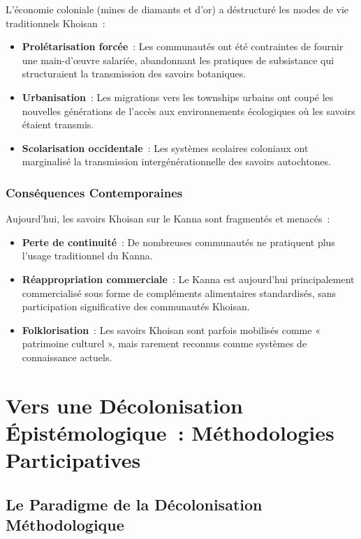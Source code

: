 \documentclass[12pt,a4paper,twoside]{book}
\begin{document}
L'économie coloniale (mines de diamants et d'or) a déstructuré les modes de vie traditionnels Khoisan~:

\begin{itemize}
\item \textbf{Prolétarisation forcée}~: Les communautés ont été contraintes de fournir une main-d'œuvre salariée, abandonnant les pratiques de subsistance qui structuraient la transmission des savoirs botaniques.

\item \textbf{Urbanisation}~: Les migrations vers les townships urbains ont coupé les nouvelles générations de l'accès aux environnements écologiques où les savoirs étaient transmis.

\item \textbf{Scolarisation occidentale}~: Les systèmes scolaires coloniaux ont marginalisé la transmission intergénérationnelle des savoirs autochtones.
\end{itemize}

\subsubsection{Conséquences Contemporaines}

Aujourd'hui, les savoirs Khoisan sur le Kanna sont fragmentés et menacés~:

\begin{itemize}
\item \textbf{Perte de continuité}~: De nombreuses communautés ne pratiquent plus l'usage traditionnel du Kanna.

\item \textbf{Réappropriation commerciale}~: Le Kanna est aujourd'hui principalement commercialisé sous forme de compléments alimentaires standardisés, sans participation significative des communautés Khoisan.

\item \textbf{Folklorisation}~: Les savoirs Khoisan sont parfois mobilisés comme « patrimoine culturel », mais rarement reconnus comme systèmes de connaissance actuels.
\end{itemize}

\section{Vers une Décolonisation Épistémologique~: Méthodologies Participatives}

\subsection{Le Paradigme de la Décolonisation Méthodologique}
\end{document}
